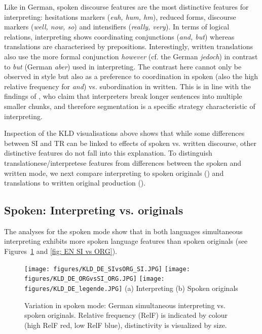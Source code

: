 \documentclass[output=paper,colorlinks,citecolor=brown]{langscibook}
\begin{document}
Like in German, spoken discourse features are the most distinctive features for interpreting:  hesitations markers (\textit{euh, hum, hm}), reduced forms, discourse markers (\textit{well, now, so}) and intensifiers (\textit{really, very}). In terms of logical relations, interpreting shows coordinating conjunctions (\textit{and, but}) whereas translations are characterised by prepositions. 
Interestingly, written translations also use the more formal conjunction  \textit{however} (cf. the German \textit{jedoch}) in contrast to \textit{but} (German \textit{aber}) used in interpreting. The contrast here cannot only be observed in style but also as a preference to coordination in spoken (also the high relative frequency for \textit{and}) vs. subordination in written. This is in line with the findings of \citet{HeEtAl2016}, who claim that interpreters break longer sentences into multiple smaller chunks, and therefore segmentation is a specific strategy characteristic of interpreting.


Inspection of the  KLD visualisations above shows that while some differences between SI and TR can be linked to effects of spoken vs. written discourse, other distinctive features do not fall into this explanation. To distinguish translationese/interpretese features from differences between the spoken and written mode, we next compare interpreting to spoken originals () and translations to written original production (). 

\subsection{Spoken: Interpreting vs. originals}\label{KLD Spoken}

The analyses for the spoken mode show that in both languages simultaneous interpreting exhibits more spoken language features than spoken originals (see Figures~\ref{fig: DE SI vs ORG} and \ref{fig: EN SI vs ORG}).

\begin{figure}
\texttt{[image: figures/KLD\_DE\_SIvsORG\_SI.JPG]}
\texttt{[image: figures/KLD\_DE\_ORGvsSI\_ORG.JPG]}
\texttt{[image: figures/KLD\_DE\_legende.JPG]}
(a) Interpreting  \hspace{2cm}  (b) Spoken originals
\caption{\label{fig: DE SI vs ORG} Variation in spoken mode: German simultaneous interpreting vs. spoken originals. Relative frequency (RelF) is indicated by colour (high RelF red, low RelF blue), distinctivity is visualized by size.}
\end{figure}
\end{document}
